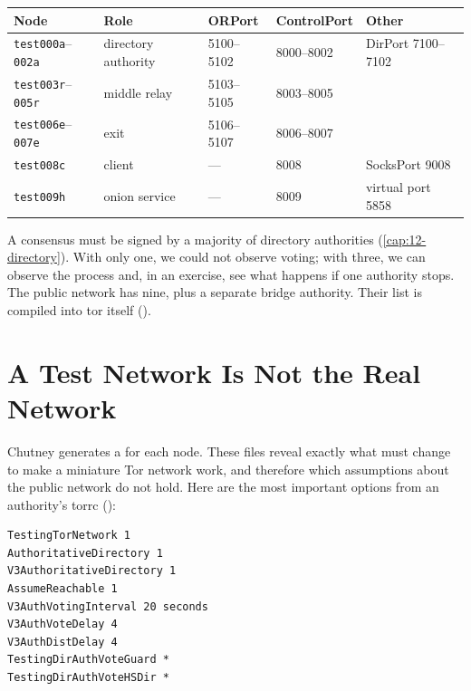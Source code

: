 \begin{center}\small
\begin{tabular}{lllll}
\toprule
Node & Role & ORPort & ControlPort & Other \\
\midrule
\texttt{test000a}--\texttt{002a} & directory authority & 5100--5102 & 8000--8002 & DirPort 7100--7102 \\
\texttt{test003r}--\texttt{005r} & middle relay & 5103--5105 & 8003--8005 & \\
\texttt{test006e}--\texttt{007e} & exit & 5106--5107 & 8006--8007 & \\
\texttt{test008c} & client & --- & 8008 & SocksPort 9008 \\
\texttt{test009h} & onion service & --- & 8009 & virtual port 5858 \\
\bottomrule
\end{tabular}
\end{center}

\begin{approfondimento}
A consensus must be signed by a majority of directory authorities (\cref{cap:12-directory}). With only one, we could not observe voting; with three, we can observe the process and, in an exercise, see what happens if one authority stops. The public network has nine, plus a separate bridge authority. Their list is compiled into tor itself ().
\end{approfondimento}

\section{A Test Network Is Not the Real Network}\label{sec:rp-opzioni}

Chutney generates a  for each node. These files reveal exactly what must change to make a miniature Tor network work, and therefore which assumptions about the public network do not hold. Here are the most important options from an authority's torrc ():
\begin{lstlisting}[language=torrc,numbers=none]
TestingTorNetwork 1
AuthoritativeDirectory 1
V3AuthoritativeDirectory 1
AssumeReachable 1
V3AuthVotingInterval 20 seconds
V3AuthVoteDelay 4
V3AuthDistDelay 4
TestingDirAuthVoteGuard *
TestingDirAuthVoteHSDir *
\end{lstlisting}

